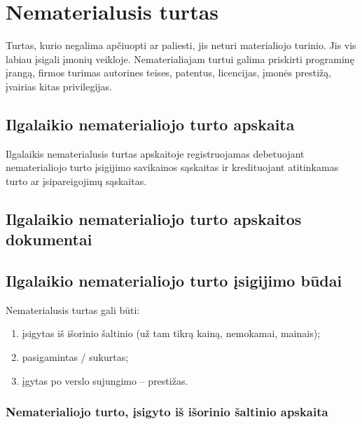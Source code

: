 
\section{Nematerialusis turtas}


Turtas, kurio negalima apčiuopti ar paliesti, jis neturi materialiojo
turinio. Jis vis labiau įsigali įmonių veikloje. Nematerialiajam turtui
galima priskirti programinę įrangą, firmos turimas autorines teises,
patentus, licencijas, įmonės prestižą, įvairias kitas privilegijas.

\subsection{Ilgalaikio nematerialiojo turto apskaita}


Ilgalaikis nematerialusis turtas apskaitoje registruojamas debetuojant
nematerialiojo turto įsigijimo savikainos sąskaitas ir kredituojant
atitinkamas turto ar įsipareigojimų sąskaitas.



\subsection{Ilgalaikio nematerialiojo turto apskaitos dokumentai}


\subsection{Ilgalaikio nematerialiojo turto įsigijimo būdai}


Nematerialusis turtas gali būti:
\begin{enumerate}
  \item įsigytas iš išorinio šaltinio (už tam tikrą kainą, nemokamai,
    mainais);
  \item pasigamintas / sukurtas;
  \item įgytas po verslo sujungimo – prestižas.
\end{enumerate}

\subsubsection{Nematerialiojo turto, įsigyto iš išorinio šaltinio apskaita}

